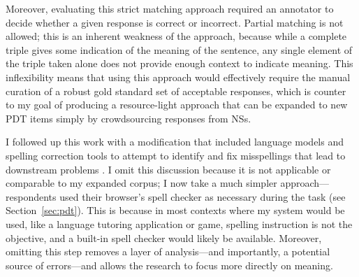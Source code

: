 Moreover, evaluating this strict matching approach required an annotator to decide whether a given response is correct or incorrect. Partial matching is not allowed; this is an inherent weakness of the approach, because while a complete triple gives some indication of the meaning of the sentence, any single element of the triple taken alone does not provide enough context to indicate meaning. This inflexibility means that using this approach would effectively require the manual curation of a robust gold standard set of acceptable responses, which is counter to my goal of producing a resource-light approach that can be expanded to new PDT items simply by crowdsourcing responses from NSs.


I followed up this work with a modification that included language models and spelling correction tools to attempt to identify and fix misspellings that lead to downstream problems \citep{king:dickinson:14}. I omit this discussion because it is not applicable or comparable to my expanded corpus; I now take a much simpler approach---respondents used their browser's spell checker as necessary during the task (see Section~\ref{sec:pdt}). This is because in most contexts where my system would be used, like a language tutoring application or game, spelling instruction is not the objective, and a built-in spell checker would likely be available. Moreover, omitting this step removes a layer of analysis---and importantly, a potential source of errors---and allows the research to focus more directly on meaning.

